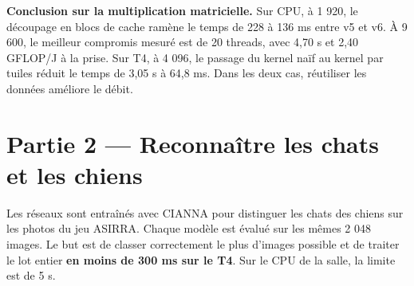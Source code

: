 \documentclass[10pt,a4paper]{article}
\begin{document}
\textbf{Conclusion sur la multiplication matricielle.} Sur CPU, à 1 920, le découpage en blocs de cache ramène le temps de 228 à 136 ms entre v5 et v6. À 9 600, le meilleur compromis mesuré est de 20 threads, avec 4,70 s et 2,40 GFLOP/J à la prise. Sur T4, à 4 096, le passage du kernel naïf au kernel par tuiles réduit le temps de 3,05 s à 64,8 ms. Dans les deux cas, réutiliser les données améliore le débit.

\clearpage

\section*{\sffamily Partie 2 — Reconnaître les chats et les chiens}

Les réseaux sont entraînés avec CIANNA pour distinguer les chats des chiens sur les photos du jeu ASIRRA. Chaque modèle est évalué sur les mêmes 2 048 images. Le but est de classer correctement le plus d’images possible et de traiter le lot entier \textbf{en moins de 300 ms sur le T4}. Sur le CPU de la salle, la limite est de 5 s.
\end{document}
